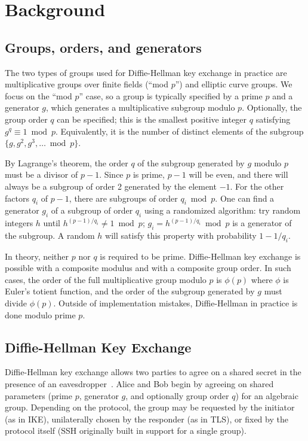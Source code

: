
\section{Background}

\subsection{Groups, orders, and generators}
\label{sec:group-background}

The two types of groups used for Diffie-Hellman key exchange in practice are
multiplicative groups over finite fields (``mod $p$'') and elliptic curve
groups. We focus on the ``mod $p$'' case, so a group is typically specified by
a prime $p$ and a generator $g$, which generates a multiplicative subgroup
modulo $p$.  Optionally, the group order $q$ can be specified; this is the
smallest positive integer $q$ satisfying $g^q \equiv 1 \bmod p$.  Equivalently,
it is the number of distinct elements of the subgroup $\{g, g^2, g^3, \dots
\bmod p\}$.

By Lagrange's theorem, the order $q$ of the subgroup generated by $g$ modulo
$p$ must be a divisor of $p-1$. Since $p$ is prime, $p-1$ will be even, and
there will always be a subgroup of order 2 generated by the element $-1$. For
the other factors $q_i$ of $p-1$, there are subgroups of order $q_i \bmod p$.
One can find a generator $g_i$ of a subgroup of order $q_i$ using a randomized
algorithm: try random integers $h$ until $h^{(p-1)/q_i} \ne 1 \bmod p$; $g_i =
h^{(p-1)/q_i} \bmod p$ is a generator of the subgroup.  A random $h$ will
satisfy this property with probability $1 - 1/q_i$.

In theory, neither $p$ nor $q$ is required to be prime. Diffie-Hellman key
exchange is possible with a composite modulus and with a composite group order.
In such cases, the order of the full multiplicative group modulo $p$ is
$\phi(p)$ where $\phi$ is Euler's totient function, and the order of the
subgroup generated by $g$ must divide $\phi(p)$. Outside of implementation
mistakes, Diffie-Hellman in practice is done modulo prime $p$.

\subsection{Diffie-Hellman Key Exchange}

Diffie-Hellman key exchange allows two parties to agree on a shared secret in
the presence of an eavesdropper~\cite{diffie1976new}. Alice and Bob begin by
agreeing on shared parameters (prime $p$, generator $g$, and optionally group
order $q$) for an algebraic group.  Depending on the protocol, the group may be
requested by the initiator (as in IKE), unilaterally chosen by the responder
(as in TLS), or fixed by the protocol itself (SSH originally built in support
for a single group).

